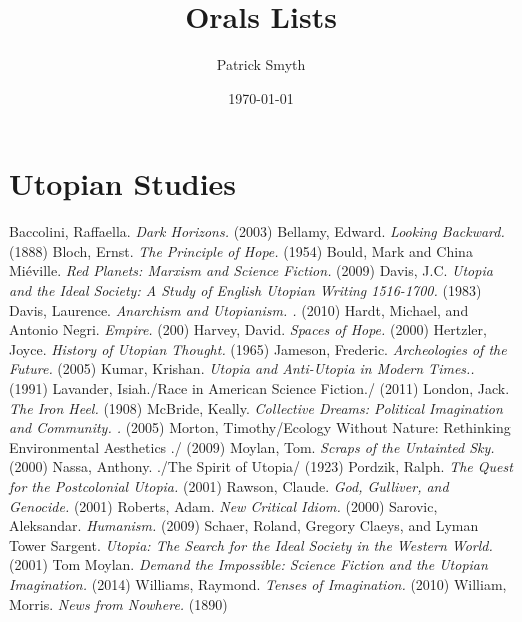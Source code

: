 \documentclass[11pt]{article}
\author{Patrick Smyth}
\date{\today}
\title{Orals Lists}
\begin{document}
\maketitle

\section*{Utopian Studies}
\label{sec-1}
Baccolini, Raffaella. \emph{Dark Horizons.} (2003)
Bellamy, Edward. \emph{Looking Backward.} (1888)
Bloch, Ernst. \emph{The Principle of Hope.} (1954)
Bould, Mark and China Miéville. \emph{Red Planets: Marxism and Science Fiction.} (2009)
Davis, J.C. \emph{Utopia and the Ideal Society: A Study of English Utopian Writing 1516-1700.} (1983)
Davis, Laurence. \emph{Anarchism and Utopianism. .} (2010)
Hardt, Michael, and Antonio Negri. \emph{Empire.} (200)
Harvey, David. \emph{Spaces of Hope.} (2000)
Hertzler, Joyce. \emph{History of Utopian Thought.} (1965)
Jameson, Frederic. \emph{Archeologies of the Future.} (2005)
Kumar, Krishan. \emph{Utopia and Anti-Utopia in Modern Times..} (1991)
Lavander, Isiah./Race in American Science Fiction./ (2011)
London, Jack. \emph{The Iron Heel.} (1908)
McBride, Keally. \emph{Collective Dreams: Political Imagination and Community. .} (2005)
Morton, Timothy/Ecology Without Nature: Rethinking Environmental Aesthetics ./ (2009)
Moylan, Tom. \emph{Scraps of the Untainted Sky.} (2000)
Nassa, Anthony. ./The Spirit of Utopia/ (1923)
Pordzik, Ralph. \emph{The Quest for the Postcolonial Utopia.} (2001)
Rawson, Claude. \emph{God, Gulliver, and Genocide.} (2001)
Roberts, Adam. \emph{New Critical Idiom.} (2000)
Sarovic, Aleksandar. \emph{Humanism.} (2009)
Schaer, Roland, Gregory Claeys, and Lyman Tower Sargent. \emph{Utopia: The Search for the Ideal Society in the Western World.}  (2001)
Tom Moylan. \emph{Demand the Impossible: Science Fiction and the Utopian Imagination.} (2014)
Williams, Raymond. \emph{Tenses of Imagination.} (2010)
William, Morris. \emph{News from Nowhere.} (1890)
\end{document}
